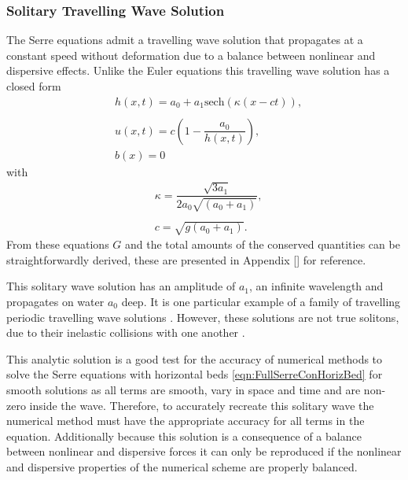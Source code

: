 \subsubsection{Solitary Travelling Wave Solution}
The Serre equations admit a travelling wave solution that propagates at a constant speed without deformation due to a balance between nonlinear and dispersive effects. Unlike the Euler equations this travelling wave solution has a closed form
\begin{subequations}
	\begin{align}
	&h(x,t) = a_0 + a_1\text{sech}\left(\kappa \left(x - ct\right)\right), \\  \nonumber \\
	&u(x,t) = c\left(1 - \dfrac{a_0}{h(x,t)}\right), \\
	&b(x) = 0
	\end{align}
	\label{eqn:Solitondefhub}
\end{subequations}
with
\begin{align*}
&\kappa = \dfrac{\sqrt{3a_1}}{2 a_0\sqrt{\left(a_0 + a_1\right)}}, \\ \\
&c = \sqrt{g(a_0 + a_1)}.
\end{align*}
From these equations $G$ and the total amounts of the conserved quantities can be straightforwardly derived, these are presented in Appendix [] for reference. 

This solitary wave solution has an amplitude of $a_1$, an infinite wavelength and propagates on water $a_0$ deep. It is one particular example of a family of travelling periodic travelling wave solutions \cite{El-etal-2006}. However, these solutions are not true solitons, due to their inelastic collisions with one another \cite{Dutykh-etal-2013-761}. 

This analytic solution is a good test for the accuracy of numerical methods to solve the Serre equations with horizontal beds \eqref{eqn:FullSerreConHorizBed} for smooth solutions as all terms are smooth, vary in space and time and are non-zero inside the wave. Therefore, to accurately recreate this solitary wave the numerical method must have the appropriate accuracy for all terms in the equation. Additionally because this solution is a consequence of a balance between nonlinear and dispersive forces it can only be reproduced if the nonlinear and dispersive properties of the numerical scheme are properly balanced.

